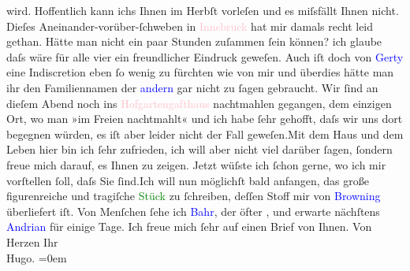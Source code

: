                wird. Hoffentlich kann ichs Ihnen im Herbſt vorleſen und es miſsfällt Ihnen
               nicht.\pend
           \pstart
           Dieſes Aneinander-vorüber-ſchweben in \textcolor{pink}{Innsbruck}{}\ledrightnote{\textcolor{pink}{Innsbruck}} hat
               mir damals recht leid gethan. Hätte man nicht ein paar Stunden zuſammen ſein können?
               ich glaube daſs wäre für alle vier ein freundlicher Eindruck geweſen.
               Auch iſt doch von \textcolor{blue}{Gerty}{}\ledrightnote{\textcolor{blue}{Gertrude von Hofmannsthal}} eine Indiscretion eben ſo
               wenig zu fürchten wie von mir und überdies hätte man ihr den Familiennamen der \textcolor{blue}{andern}{} gar nicht zu ſagen
               gebraucht. Wir ſind an dieſem Abend noch ins \textcolor{pink}{Hofgartengaſthaus}{}\ledrightnote{\textcolor{pink}{Hofgartengasthaus}} nachtmahlen gegangen, dem einzigen Ort, wo man »im Freien
               nachtmahlt« und ich habe ſehr gehofft, {\pb}daſs wir uns dort begegnen würden,
               es iſt aber leider nicht der Fall geweſen.\hspace*{2.5em}Mit dem
               Haus und dem Leben hier bin ich ſehr zufrieden, ich will aber nicht viel darüber
               ſagen, ſondern freue mich darauf, es Ihnen zu zeigen. Jetzt wüſste ich ſchon gerne,
               wo ich mir vorſtellen ſoll, daſs Sie ſind.\hspace*{2.5em}Ich will
               nun möglichſt bald anfangen, das große figurenreiche und tragiſche \textcolor{green}{Stück}{} zu ſchreiben, deſſen Stoff mir von \textcolor{blue}{Browning}{}\ledrightnote{\textcolor{blue}{Robert Browning}} überliefert iſt.\pend
           \pstart
           Von Menſchen ſehe ich \textcolor{blue}{Bahr}{}\ledrightnote{\textcolor{blue}{Hermann Bahr}}, der öfter \label{K_L01149_2v}\label{K_L01149_2h}, und erwarte nächſtens \textcolor{blue}{Andrian}{}\ledrightnote{\textcolor{blue}{Leopold von Andrian-Werburg}} für einige Tage.\pend
           \pstart
           Ich freue mich ſehr auf einen Brief von Ihnen.\pend
           \pstart
           Von Herzen Ihr{\\[\baselineskip]}\spacefill\mbox{Hugo.}\pend
           \leftskip=0em{}\endnumbering{}  
      